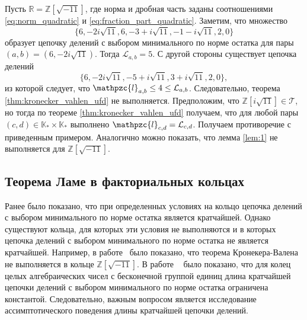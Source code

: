\documentclass[_00_dissertation.tex]{subfiles}
\begin{document}
\begin{example}\label{example:Z[sqrt{-11}]}
    Пусть $\mathbb{R}=\mathbb{Z}[\sqrt{-11}]$, где норма и дробная часть заданы соотношениями \ref{eq:norm_quadratic} и \ref{eq:fraction_part_quadratic}.
    Заметим, что множество
    \begin{equation*}
        \{6,-2i\sqrt{11},6,-3+i\sqrt{11},-1-i\sqrt{11},2,0\}
    \end{equation*}
    образует цепочку делений с выбором минимального по норме остатка для пары $(a,b)=(6,-2i\sqrt{11})$.
    Тогда $\mathcal{L}_{a,b}=5$.
    С другой стороны существует цепочка делений
    \begin{equation*}
        \{6,-2i\sqrt{11},-5+i\sqrt{11},3+i\sqrt{11},2,0\},
    \end{equation*}
    из которой следует, что $\mathpzc{l}_{a,b}\le 4\le \mathcal{L}_{a,b}$.
    Следовательно, теорема \ref{thm:kronecker_vahlen_ufd} не выполняется.
    Предположим, что $\mathbb{Z}[i\sqrt{11}]\in\mathcal{T}$, но тогда по теореме \ref{thm:kronecker_vahlen_ufd} получаем, что для любой пары $(c,d)\in\mathbb{K}_* \times\mathbb{K}_*$ выполнено $\mathpzc{l}_{c,d}=\mathcal{L}_{c,d}$.
    Получаем противоречие с приведенным примером.
    Аналогично можно показать, что лемма \ref{lem:1} не выполняется для $\mathbb{Z}[\sqrt{-11}].$
\end{example}


\subsection{Теорема Ламе в факториальных кольцах}

Ранее было показано, что при определенных условиях на кольцо цепочка делений с выбором минимального по норме остатка является кратчайшей.
Однако существуют кольца, для которых эти условия не выполняются и в которых цепочка делений с выбором минимального по норме остатка не является кратчайшей.
Например, в работе~\cite{source:Rolletschek_1990} было показано, что теорема Кронекера-Валена не выполняется в кольце $\mathbb{Z}[\sqrt{-11}]$.
В работе ~\cite{source:Cooke} было показано, что для колец целых алгебраических чисел с бесконечной группой единиц длина кратчайшей цепочки делений с выбором минимального по норме остатка ограничена константой.
Следовательно, важным вопросом является исследование ассимптотического поведения длины кратчайшей цепочки делений.
\end{document}
